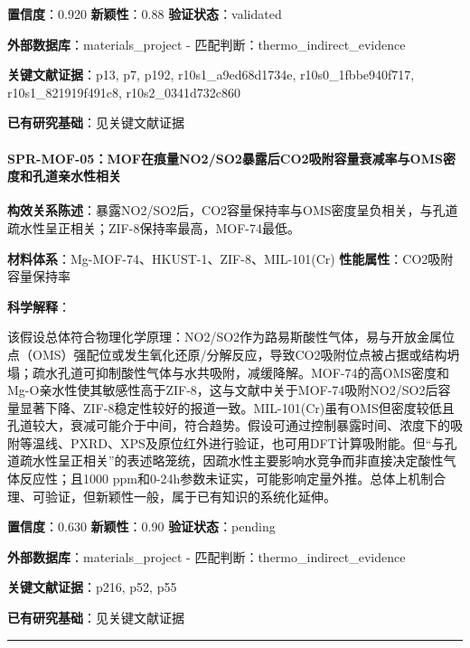 \documentclass[12pt,a4paper]{ctexart}
\begin{document}
\textbf{置信度}：0.920 \textbar{} \textbf{新颖性}：0.88 \textbar{} \textbf{验证状态}：validated

\textbf{外部数据库}：materials\_project - 匹配判断：thermo\_indirect\_evidence

\textbf{关键文献证据}：p13, p7, p192, r10s1\_a9ed68d1734e, r10s0\_1fbbe940f717, r10s1\_821919f491c8, r10s2\_0341d732c860

\textbf{已有研究基础}：见关键文献证据

\paragraph{SPR-MOF-05：MOF在痕量NO2/SO2暴露后CO2吸附容量衰减率与OMS密度和孔道亲水性相关}\label{spr-mof-05mofux5728ux75d5ux91cfno2so2ux66b4ux9732ux540eco2ux5438ux9644ux5bb9ux91cfux8870ux51cfux7387ux4e0eomsux5bc6ux5ea6ux548cux5b54ux9053ux4eb2ux6c34ux6027ux76f8ux5173}

\textbf{构效关系陈述}：暴露NO2/SO2后，CO2容量保持率与OMS密度呈负相关，与孔道疏水性呈正相关；ZIF-8保持率最高，MOF-74最低。

\textbf{材料体系}：Mg-MOF-74、HKUST-1、ZIF-8、MIL-101(Cr) \textbar{} \textbf{性能属性}：CO2吸附容量保持率

\textbf{科学解释}：

该假设总体符合物理化学原理：NO2/SO2作为路易斯酸性气体，易与开放金属位点（OMS）强配位或发生氧化还原/分解反应，导致CO2吸附位点被占据或结构坍塌；疏水孔道可抑制酸性气体与水共吸附，减缓降解。MOF-74的高OMS密度和Mg-O亲水性使其敏感性高于ZIF-8，这与文献中关于MOF-74吸附NO2/SO2后容量显著下降、ZIF-8稳定性较好的报道一致。MIL-101(Cr)虽有OMS但密度较低且孔道较大，衰减可能介于中间，符合趋势。假设可通过控制暴露时间、浓度下的吸附等温线、PXRD、XPS及原位红外进行验证，也可用DFT计算吸附能。但``与孔道疏水性呈正相关''的表述略笼统，因疏水性主要影响水竞争而非直接决定酸性气体反应性；且1000 ppm和0-24h参数未证实，可能影响定量外推。总体上机制合理、可验证，但新颖性一般，属于已有知识的系统化延伸。

\textbf{置信度}：0.630 \textbar{} \textbf{新颖性}：0.90 \textbar{} \textbf{验证状态}：pending

\textbf{外部数据库}：materials\_project - 匹配判断：thermo\_indirect\_evidence

\textbf{关键文献证据}：p216, p52, p55

\textbf{已有研究基础}：见关键文献证据

\begin{center}\rule{0.5\linewidth}{0.5pt}\end{center}
\end{document}
